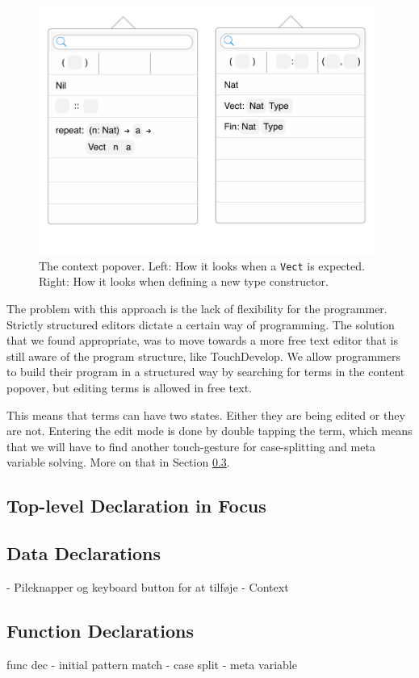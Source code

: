 \begin{figure}
	\centering
		\includegraphics[width=110mm]{diagrams/final_design_popover.pdf}
	\caption{The context popover. Left: How it looks when a \texttt{Vect} is
	expected. Right: How it looks when defining a new type constructor.}
\label{fig:new_design_popover}
\end{figure}

The problem with this approach is the lack of flexibility for the programmer.
Strictly structured editors dictate a certain way of programming. The solution
that we found appropriate, was to move towards a more free text editor that is
still aware of the program structure, like TouchDevelop. We allow programmers
to build their program in a structured way by searching for terms in the
content popover, but editing terms is allowed in free text.

This means that terms can have two states. Either they are being edited or they are not. Entering the edit mode is done by double tapping the term, which means that we will have to find another touch-gesture for case-splitting and meta variable solving.
More on that in Section \ref{subsec:new_design_function_dec}.


\subsection{Top-level Declaration in Focus}

\subsection{Data Declarations}
\label{subsec:new_design_data_dec}
- Pileknapper og keyboard button for at tilføje
- Context

\subsection{Function Declarations}
\label{subsec:new_design_function_dec}
func dec
- initial pattern match
- case split
- meta variable

